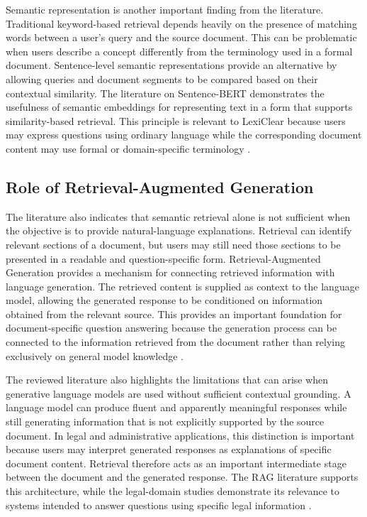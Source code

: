 \documentclass[12pt,a4paper,oneside]{report}
\begin{document}
Semantic representation is another important finding from the literature.
Traditional keyword-based retrieval depends heavily on the presence of
matching words between a user's query and the source document. This can be
problematic when users describe a concept differently from the terminology
used in a formal document. Sentence-level semantic representations provide an
alternative by allowing queries and document segments to be compared based on
their contextual similarity. The literature on Sentence-BERT demonstrates
the usefulness of semantic embeddings for representing text in a form that
supports similarity-based retrieval. This principle is relevant to LexiClear
because users may express questions using ordinary language while the
corresponding document content may use formal or domain-specific terminology
\cite{reimers2019sbert}.

\subsection{Role of Retrieval-Augmented Generation}

The literature also indicates that semantic retrieval alone is not sufficient
when the objective is to provide natural-language explanations. Retrieval can
identify relevant sections of a document, but users may still need those
sections to be presented in a readable and question-specific form.
Retrieval-Augmented Generation provides a mechanism for connecting retrieved
information with language generation. The retrieved content is supplied as
context to the language model, allowing the generated response to be
conditioned on information obtained from the relevant source. This provides
an important foundation for document-specific question answering because the
generation process can be connected to the information retrieved from the
document rather than relying exclusively on general model knowledge
\cite{lewis2020rag,jurisai2025}.

The reviewed literature also highlights the limitations that can arise when
generative language models are used without sufficient contextual grounding.
A language model can produce fluent and apparently meaningful responses while
still generating information that is not explicitly supported by the source
document. In legal and administrative applications, this distinction is
important because users may interpret generated responses as explanations of
specific document content. Retrieval therefore acts as an important
intermediate stage between the document and the generated response. The RAG
literature supports this architecture, while the legal-domain studies
demonstrate its relevance to systems intended to answer questions using
specific legal information
\cite{basha2024,lewis2020rag,jurisai2025}.
\end{document}
